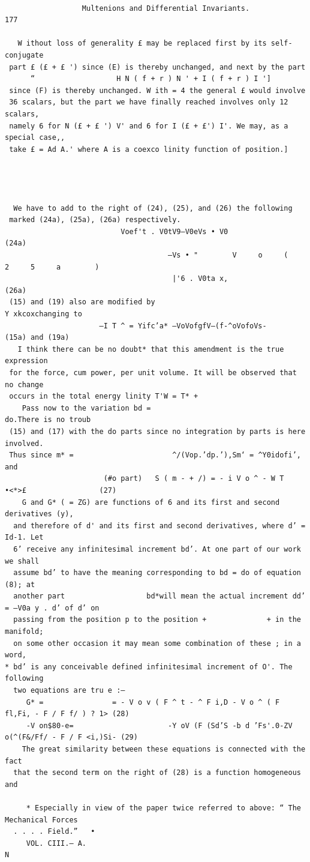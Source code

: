 \documentclass[10pt]{article}
\begin{document}
\clearpage
\begin{verbatim}

                  Multenions and Differential Invariants.                                   177

   W ithout loss of generality £ may be replaced first by its self-conjugate
 part £ (£ + £ ') since (E) is thereby unchanged, and next by the part
      “                   H N ( f + r ) N ' + I ( f + r ) I ']
 since (F) is thereby unchanged. W ith = 4 the general £ would involve
 36 scalars, but the part we have finally reached involves only 12 scalars,
 namely 6 for N (£ + £ ') V' and 6 for I (£ + £') I'. We may, as a special case,,
 take £ = Ad A.' where A is a coexco linity function of position.]




  We have to add to the right of (24), (25), and (26) the following
 marked (24a), (25a), (26a) respectively.
                           Voef't . V0tV9—V0eVs • V0                                     (24a)
                                      —Vs • "        V     o     (     2     5     a        )
                                       |'6 . V0ta x,                                    (26a)
 (15) and (19) also are modified by                                                    Y xkcoxchanging to
                      —I T ^ = Yifc’a* —VoVofgfV—(f-^oVofoVs-              (15a) and (19a)
   I think there can be no doubt* that this amendment is the true expression
 for the force, cum power, per unit volume. It will be observed that no change
 occurs in the total energy linity T'W = T* +
    Pass now to the variation bd =                                        do.There is no troub
 (15) and (17) with the do parts since no integration by parts is here involved.
 Thus since m* =                       ^/(Vop.’dp.’),Sm‘ = ^Y0idofi’, and
                       (#o part)   S ( m - + /) = - i V o ^ - W T •<*>£                 (27)
    G and G* ( = ZG) are functions of 6 and its first and second derivatives (y),
  and therefore of d' and its first and second derivatives, where d’ = Id-1. Let
  6’ receive any infinitesimal increment bd’. At one part of our work we shall
  assume bd’ to have the meaning corresponding to bd = do of equation (8); at
  another part                   bd*will mean the actual increment dd’ = —V0a y . d’ of d’ on
  passing from the position p to the position +              + in the manifold;
  on some other occasion it may mean some combination of these ; in a word,
* bd’ is any conceivable defined infinitesimal increment of O'. The following
  two equations are tru e :—
     G* =                = - V o v ( F ^ t - ^ F i,D - V o ^ ( F fl,Fi, - F / F f/ ) ? 1> (28)
     -V on$80-e=                      -Y oV (F (Sd’S -b d ’Fs'.0-ZV o(^(F&/Ff/ - F / F <i,)Si- (29)
    The great similarity between these equations is connected with the fact
  that the second term on the right of (28) is a function homogeneous and

     * Especially in view of the paper twice referred to above: “ The Mechanical Forces
  . . . . Field.”   •
     VOL. CIII.— A.                                                                     N


\end{verbatim}
\end{document}
